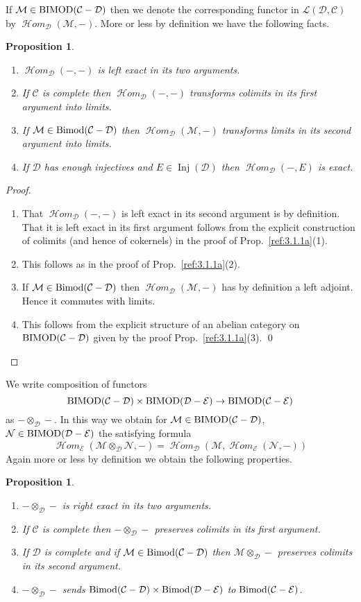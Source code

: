 \documentclass{amsproc}
\def\Cscr{{\mathcal C}}
\def\Dscr{{\mathcal D}}
\def\Escr{{\mathcal E}}
\def\Hscr{{\mathcal H}}
\def\Lscr{{\mathcal L}}
\def\Mscr{{\mathcal M}}
\def\Nscr{{\mathcal N}}
\def\HHom{\operatorname {\Hscr \mathit{om}}}
\def\Bimod{\mathop{\text{Bimod}}}
\def\BIMOD{\mathop{\text{BIMOD}}}
\def\Inj{\operatorname {Inj}}
\def\HHom{\operatorname {\Hscr \mathit{om}}}
\def\r{\rightarrow}
\let\oldtext\text
\def\text#1{\oldtext{\upshape #1}}
\newtheorem{propositions}[lemmas]{Proposition}
\theoremstyle{definition}
\theoremstyle{remark}
\numberwithin{equation}{section}
\numberwithin{table}{section}
\numberwithin{figure}{section}
\begin{document}
If $\Mscr\in \BIMOD(\Cscr-\Dscr)$ then we denote the corresponding
functor in $\Lscr(\Dscr,\Cscr)$ by
$
\HHom_\Dscr(\Mscr,-)
$.
More or less by definition we have the following facts.
\begin{propositions}
\begin{enumerate} 
\item $\HHom_\Dscr(-,-)$ is left exact in its two arguments.
\item If $\Cscr$ is complete then $\HHom_\Dscr(-,-)$ transforms
  colimits in its first argument into limits.
\item If $\Mscr\in \Bimod(\Cscr-\Dscr)$ then $\HHom_\Dscr(\Mscr,-)$
  transforms limits in its second argument into limits.
\item If $\Dscr$ has enough injectives and $E\in \Inj(\Dscr)$ then
  $\HHom_\Dscr(-,E)$ is exact.
\end{enumerate}
\end{propositions}
\begin{proof}
\begin{enumerate}
\item That $\HHom_\Dscr(-,-)$ is left exact in its second argument is by
definition. That it is left exact in its first argument follows from the
explicit construction of colimits (and hence of cokernels) in the proof of
Prop.\ \ref{ref:3.1.1a}(1).
\item
This follows as in the proof of Prop.\ \ref{ref:3.1.1a}(2).
\item If $\Mscr\in\Bimod(\Cscr-\Dscr)$ then $\HHom_\Dscr(\Mscr,-)$ has by
definition a left adjoint. Hence it commutes with limits.
\item This follows from the explicit structure of an abelian category on
$\BIMOD(\Cscr-\Dscr)$ given by the proof Prop.\ \ref{ref:3.1.1a}(3).
\qed\end{enumerate}
\def\qed{}
\end{proof}
 We write composition of functors
\[
\BIMOD(\Cscr-\Dscr)\times \BIMOD(\Dscr-\Escr)\r \BIMOD(\Cscr-\Escr)
\]
as $-\otimes_\Dscr-$. In this way we obtain for $\Mscr\in
\BIMOD(\Cscr-\Dscr)$, $\Nscr\in \BIMOD(\Dscr-\Escr)$ the satisfying
formula
\[
\HHom_\Escr(\Mscr\otimes_\Dscr\Nscr,-)=\HHom_\Dscr(\Mscr,\HHom_\Escr(\Nscr,-))
\]
Again more or less by definition we obtain the following properties.
\begin{propositions}
\begin{enumerate}
\item $-\otimes_\Dscr-$ is right exact in its two arguments.
\item If $\Cscr$ is complete then $-\otimes_\Dscr-$ preserves colimits
  in its first argument.
\item If $\Dscr$ is complete and if $\Mscr\in \Bimod(\Cscr-\Dscr)$
  then $\Mscr\otimes_\Dscr-$ preserves colimits in its second
  argument.
\item $-\otimes_\Dscr-$ sends $\Bimod(\Cscr-\Dscr)\times
  \Bimod(\Dscr-\Escr)$ to $\Bimod(\Cscr-\Escr)$.
\end{enumerate}
\end{propositions}
\end{document}
